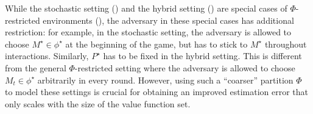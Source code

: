 While the stochastic setting () and the hybrid setting () are special cases of $\Phi$-restricted environments (), the adversary in these special cases has additional restriction: for example, in the stochastic setting, the adversary is allowed to choose $M^\star\in\phi^\star$ at the beginning of the game, but has to stick to $M^\star$ throughout interactions. Similarly, $P^\star$ has to be fixed in the hybrid setting. This is different from the general $\Phi$-restricted setting where the adversary is allowed to choose $M_t\in\phi^\star$ arbitrarily in every round. However, using such a ``coarser'' partition $\Phi$ to model these settings is crucial for obtaining an improved estimation error that only scales with the size of the value function set. 


